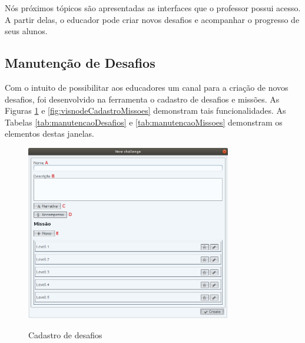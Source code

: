 \documentclass[
	12pt,				%
	oneside,			%
	a4paper,			%
	english,			%
	french,				%
	spanish,			%
	brazil,				%
	]{abntex2}
\begin{document}
Nós próximos tópicos são apresentadas as interfaces que o professor possui acesso. A partir delas, o educador pode criar novos desafios e acompanhar o progresso de seus alunos.

\subsection{Manutenção de Desafios}

Com o intuito de possibilitar aos educadores um canal para a criação de novos desafios, foi desenvolvido na ferramenta o cadastro de desafios e missões. As Figuras \ref{fig:visnodeCadastroDesafio} e \ref{fig:visnodeCadastroMissoes} demonstram tais funcionalidades. As Tabelas \ref{tab:manutencaoDesafios} e \ref{tab:manutencaoMissoes} demonstram os elementos destas janelas.

\begin{figure}[H]
\centering
\caption{Cadastro de desafios}
\includegraphics[width=0.8\textwidth]{imagens/visnode_cadastro_desafio.png}
\sourceAuthor
\label{fig:visnodeCadastroDesafio}
\end{figure}
\end{document}
